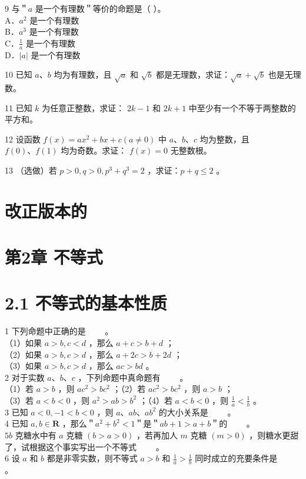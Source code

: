 \documentclass[10pt]{article}
\begin{document}
9 与＂\(a\) 是一个有理数＂等价的命题是（ ）。\\
A．\(a^{2}\) 是一个有理数\\
B．\(a^{3}\) 是一个有理数\\
C．\(\frac{1}{a}\) 是一个有理数\\
D．\(|a|\) 是一个有理数

10 已知 \(a 、 b\) 均为有理数，且 \(\sqrt{a}\) 和 \(\sqrt{b}\) 都是无理数，求证：\(\sqrt{a}+\sqrt{b}\) 也是无理数。

11 已知 \(k\) 为任意正整数，求证： \(2 k-1\) 和 \(2 k+1\) 中至少有一个不等于两整数的平方和。

12 设函数 \(f(x)=a x^{2}+b x+c(a \neq 0)\) 中 \(a 、 b 、 c\) 均为整数，且 \(f(0) 、 f(1)\) 均为奇数。求证： \(f(x)=0\) 无整数根。

13 （选做）若 \(p>0, q>0, p^{3}+q^{3}=2\) ，求证：\(p+q \leqslant 2\) 。



\section{改正版本的}



\newpage

\section*{第2章 不等式}
\section*{2.1 不等式的基本性质}
1 下列命题中正确的是 \(\qquad\)。\\
（1）如果 \(a>b, c<d\) ，那么 \(a+c>b+d\) ；\\
（2）如果 \(a>b, c>d\) ，那么 \(a+2 c>b+2 d\) ；\\
（3）如果 \(a>b, c>d\) ，那么 \(a c>b d\) 。\\
2 对于实数 \(a 、 b 、 c\) ，下列命题中真命题有 \(\qquad\)。\\
（1）若 \(a>b\) ，则 \(a c^{2}>b c^{2}\) ；（2）若 \(a c^{2}>b c^{2}\) ，则 \(a>b\) ；\\
（3）若 \(a<b<0\) ，则 \(a^{2}>a b>b^{2}\) ；（4）若 \(a<b<0\) ，则 \(\frac{1}{a}<\frac{1}{b}\) 。\\
3 已知 \(a<0,-1<b<0\) ，则 \(a 、 a b 、 a b^{2}\) 的大小关系是 \(\qquad\)。\\
4 已知 \(a, b \in \mathbf{R}\) ，那么＂\(a^{2}+b^{2}<1\)＂是＂\(a b+1>a+b\)＂的 \(\qquad\)。\\
\(5 b\) 克糖水中有 \(a\) 克糖 \((b>a>0)\) ，若再加人 \(m\) 克糖 \((m>0)\) ，则糖水更甜了，试根据这个事实写出一个不等式 \(\qquad\)。\\
6 设 \(a\) 和 \(b\) 都是非零实数，则不等式 \(a>b\) 和 \(\frac{1}{a}>\frac{1}{b}\) 同时成立的充要条件是 \(\qquad\)。
\end{document}
